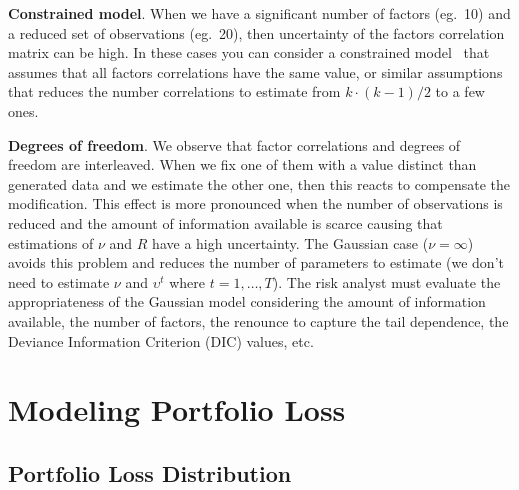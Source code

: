 \documentclass[11pt,fleqn]{book} %
\begin{document}
\textbf{Constrained model}. When we have a significant number of factors 
(eg.\ 10) and a reduced set of observations (eg.\ 20), then uncertainty of 
the factors correlation matrix can be high. In these cases you can consider 
a constrained model~\cite{roncalli:2004} that assumes that all factors
correlations have the same value, or similar assumptions that reduces the 
number correlations to estimate from $k \cdot(k-1)/2$ to a few ones.

\textbf{Degrees of freedom}. We observe that factor correlations and degrees 
of freedom are interleaved. When we fix one of them with a value distinct 
than generated data and we estimate the other one, then this reacts to 
compensate the modification. This effect is more pronounced when the number 
of observations is reduced and the amount of 
information available is scarce causing that estimations of $\nu$ and $R$
have a high uncertainty. The Gaussian case ($\nu = \infty$) avoids this 
problem and reduces the number of parameters to estimate (we don't need to 
estimate $\nu$ and $\upsilon^t$ where $t=1,\dots,T$). 
The risk analyst must evaluate the appropriateness of the Gaussian model 
considering the amount of information available, the number of factors, 
the renounce to capture the tail dependence, the Deviance Information 
Criterion (DIC) values, etc.


\chapter{Modeling Portfolio Loss}

\section{Portfolio Loss Distribution}
\end{document}
